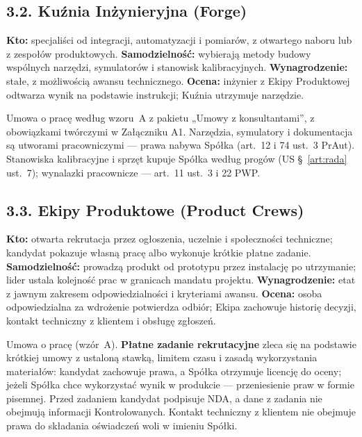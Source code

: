 \documentclass[11pt,a4paper]{report}
\newcommand{\US}[1]{US §~#1}
\begin{document}
\subsection*{3.2. Kuźnia Inżynieryjna (Forge)}
\textbf{Kto:} specjaliści od integracji, automatyzacji i pomiarów, z otwartego naboru lub z zespołów produktowych. \textbf{Samodzielność:} wybierają metody budowy wspólnych narzędzi, symulatorów i stanowisk kalibracyjnych. \textbf{Wynagrodzenie:} stałe, z możliwością awansu technicznego. \textbf{Ocena:} inżynier z Ekipy Produktowej odtwarza wynik na podstawie instrukcji; Kuźnia utrzymuje narzędzie.
\begin{Prawo}
Umowa o pracę według wzoru~A z pakietu „Umowy z konsultantami”, z obowiązkami twórczymi w Załączniku A1. Narzędzia, symulatory i dokumentacja są utworami pracowniczymi --- prawa nabywa Spółka (art.~12 i 74 ust.~3 PrAut). Stanowiska kalibracyjne i sprzęt kupuje Spółka według progów (\US{\ref{art:rada} ust.~7}); wynalazki pracownicze --- art.~11 ust.~3 i 22 PWP.
\end{Prawo}

\subsection*{3.3. Ekipy Produktowe (Product Crews)}
\textbf{Kto:} otwarta rekrutacja przez ogłoszenia, uczelnie i społeczności techniczne; kandydat pokazuje własną pracę albo wykonuje krótkie płatne zadanie. \textbf{Samodzielność:} prowadzą produkt od prototypu przez instalację po utrzymanie; lider ustala kolejność prac w granicach mandatu projektu. \textbf{Wynagrodzenie:} etat z jawnym zakresem odpowiedzialności i kryteriami awansu. \textbf{Ocena:} osoba odpowiedzialna za wdrożenie potwierdza odbiór; Ekipa zachowuje historię decyzji, kontakt techniczny z klientem i obsługę zgłoszeń.
\begin{Prawo}
Umowa o pracę (wzór~A). \textbf{Płatne zadanie rekrutacyjne} zleca się na podstawie krótkiej umowy z ustaloną stawką, limitem czasu i zasadą wykorzystania materiałów: kandydat zachowuje prawa, a Spółka otrzymuje licencję do oceny; jeżeli Spółka chce wykorzystać wynik w produkcie --- przeniesienie praw w formie pisemnej. Przed zadaniem kandydat podpisuje NDA, a dane z zadania nie obejmują informacji Kontrolowanych. Kontakt techniczny z klientem nie obejmuje prawa do składania oświadczeń woli w imieniu Spółki.
\end{Prawo}
\end{document}
